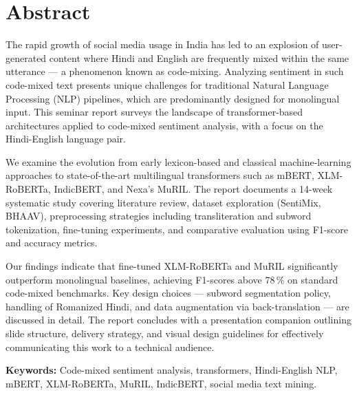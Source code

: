 \chapter*{Abstract}

The rapid growth of social media usage in India has led to an explosion of user-generated content where Hindi and English are frequently mixed within the same utterance — a phenomenon known as code-mixing. Analyzing sentiment in such code-mixed text presents unique challenges for traditional Natural Language Processing (NLP) pipelines, which are predominantly designed for monolingual input. This seminar report surveys the landscape of transformer-based architectures applied to code-mixed sentiment analysis, with a focus on the Hindi-English language pair.

We examine the evolution from early lexicon-based and classical machine-learning approaches to state-of-the-art multilingual transformers such as mBERT, XLM-RoBERTa, IndicBERT, and Nexa's MuRIL. The report documents a 14-week systematic study covering literature review, dataset exploration (SentiMix, BHAAV), preprocessing strategies including transliteration and subword tokenization, fine-tuning experiments, and comparative evaluation using F1-score and accuracy metrics.

Our findings indicate that fine-tuned XLM-RoBERTa and MuRIL significantly outperform monolingual baselines, achieving F1-scores above 78\,\% on standard code-mixed benchmarks. Key design choices — subword segmentation policy, handling of Romanized Hindi, and data augmentation via back-translation — are discussed in detail. The report concludes with a presentation companion outlining slide structure, delivery strategy, and visual design guidelines for effectively communicating this work to a technical audience.

\vspace{6pt}
\noindent\textbf{Keywords:} Code-mixed sentiment analysis, transformers, Hindi-English NLP, mBERT, XLM-RoBERTa, MuRIL, IndicBERT, social media text mining.

